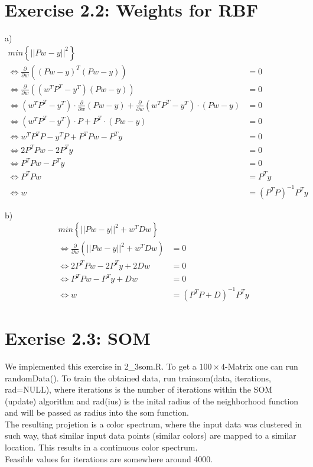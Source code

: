 \documentclass{scrartcl}
\begin{document}
\section{Exercise 2.2: Weights for RBF}

a)
\begin{align*}
  min \left\{ || P w-y ||^2\right\} &\\
 \Leftrightarrow  \frac{\partial}{\partial w} \left( (P w-y)^T (P w-y)\right) & = 0 \\
 \Leftrightarrow  \frac{\partial}{\partial w} \left( (w^T P^T -y^T) (P w-y)\right) & = 0 \\
 \Leftrightarrow  (w^T P^T -y^T) \cdot \frac{\partial}{\partial w} \left( P w-y\right) + \frac{\partial}{\partial w} \left( w^T P^T -y^T \right) \cdot (P w-y) & = 0 \\
 \Leftrightarrow  (w^T P^T -y^T) \cdot  P + P^T \cdot (P w-y) & = 0 \\
 \Leftrightarrow  w^T P^T P - y^T P + P^T P w - P^T y & = 0  \\
 \Leftrightarrow  2 P^T P w - 2 P^T y & = 0 \\
 \Leftrightarrow  P^T P w - P^T y & = 0 \\
 \Leftrightarrow  P^T P w & = P^T y \\
 \Leftrightarrow w & = (P^T P)^{-1} P^T y
\end{align*}

b)
\begin{align*}
      min \left\{ || P w-y ||^2 + w^T D w \right\} &\\
     \Leftrightarrow  \frac{\partial}{\partial w} \left(|| P w-y ||^2 + w^T D w\right) & = 0 \\
     \Leftrightarrow  2 P^T P w - 2 P^T y + 2 D w & = 0 \\
     \Leftrightarrow  P^T P w - P^T y + D w& = 0 \\
     \Leftrightarrow w & = (P^T P + D)^{-1} P^T y
\end{align*}


\section{Exerise 2.3: SOM}
We implemented this exercise in 2\_3som.R. To get a $100\times4$-Matrix one can run randomData(). To train the obtained data, run trainsom(data, iterations, rad=NULL), where iterations is the number of iterations within the SOM (update) algorithm and rad(ius) is the inital radius of the neighborhood function and will be passed as radius into the som function. \\
The resulting projetion is a color spectrum, where the input data was clustered in such way, that similar input data points (similar colors) are mapped to a similar location. This results in a continuous color spectrum. \\
Feasible values for iterations are somewhere around 4000. 
\end{document}
